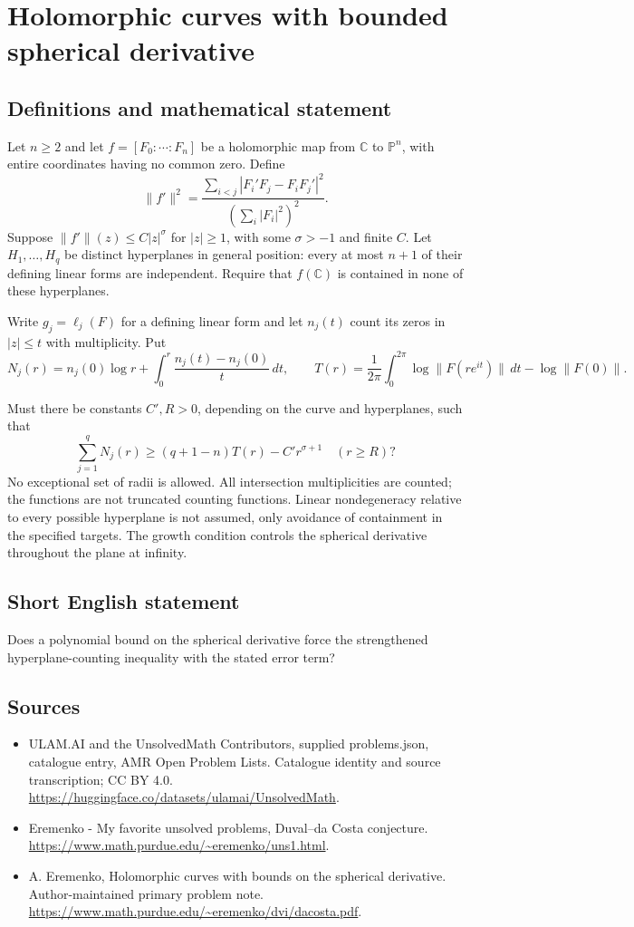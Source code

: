 \documentclass[11pt,a4paper]{article}
\begin{document}
\section*{Holomorphic curves with bounded spherical derivative}\label{statement}

\subsection{Definitions and mathematical statement}
Let $n\geq2$ and let $f=[F_0:\cdots:F_n]$
be a holomorphic map from $\mathbb C$ to
$\mathbb P^n$, with entire coordinates having no
common zero. Define
\[
 \|f'\|^2=
 \frac{\sum_{i<j}|F_i'F_j-F_iF_j'|^2}
                  {(\sum_i|F_i|^2)^2}.
\]
Suppose $\|f'\|(z)\leq C|z|^\sigma$ for
$|z|\geq1$, with some $\sigma>-1$ and
finite $C$.
Let $H_1,\ldots,H_q$ be distinct hyperplanes
in general position: every at most $n+1$
of their defining linear forms are independent.
Require that $f(\mathbb C)$ is contained in
none of these hyperplanes.

Write $g_j=\ell_j(F)$ for a defining
linear form and let $n_j(t)$ count its
zeros in $|z|\leq t$ with multiplicity.
Put
\[
 N_j(r)=n_j(0)\log r+
           \int_0^r\frac{n_j(t)-n_j(0)}t\,dt,\qquad
 T(r)=\frac1{2\pi}\int_0^{2\pi}\log\|F(re^{it})\|\,dt
                                      -\log\|F(0)\|.
\]

Must there be constants $C',R>0$, depending
on the curve and hyperplanes, such that
\[
          \sum_{j=1}^q N_j(r)
                \geq(q+1-n)T(r)-C'r^{\sigma+1}
                       \quad(r\geq R)?
\]
No exceptional set of radii is allowed.
All intersection multiplicities are counted;
the functions are not truncated counting functions.
Linear nondegeneracy relative to every possible
hyperplane is not assumed, only avoidance of
containment in the specified targets. The
growth condition controls the spherical derivative
throughout the plane at infinity.
\subsection{Short English statement}
Does a polynomial bound on the spherical derivative force the strengthened hyperplane-counting inequality with the stated error term?
\subsection{Sources}
\begin{itemize}
\item[S1] ULAM.AI and the UnsolvedMath Contributors, supplied problems.json, catalogue entry, AMR Open Problem Lists. Catalogue identity and source transcription; CC BY 4.0.
\url{https://huggingface.co/datasets/ulamai/UnsolvedMath}.
\item[S2] Eremenko - My favorite unsolved problems, Duval–da Costa conjecture. 
\url{https://www.math.purdue.edu/~eremenko/uns1.html}.
\item[S3] A. Eremenko, Holomorphic curves with bounds on the spherical derivative. Author-maintained primary problem note.
\url{https://www.math.purdue.edu/~eremenko/dvi/dacosta.pdf}.
\end{itemize}
\end{document}
